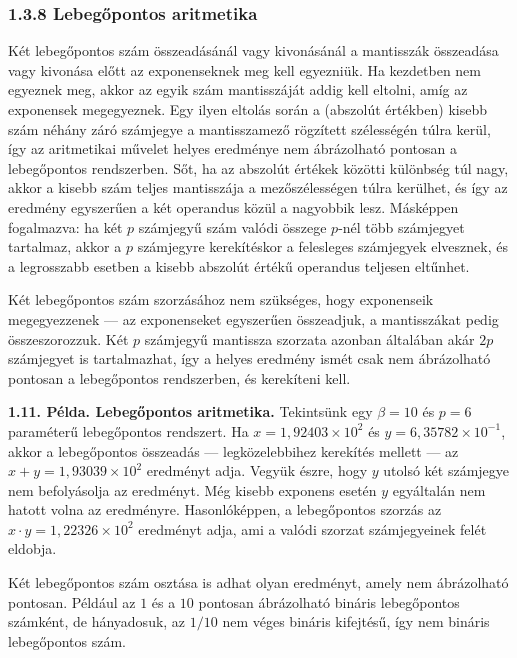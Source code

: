 \documentclass[
  magyar,
  11pt]{article}
\begin{document}
\subsubsection{1.3.8 Lebegőpontos
aritmetika}\label{lebegux151pontos-aritmetika}

Két lebegőpontos szám összeadásánál vagy kivonásánál a mantisszák
összeadása vagy kivonása előtt az exponenseknek meg kell egyezniük. Ha
kezdetben nem egyeznek meg, akkor az egyik szám mantisszáját addig kell
eltolni, amíg az exponensek megegyeznek. Egy ilyen eltolás során a
(abszolút értékben) kisebb szám néhány záró számjegye a mantisszamező
rögzített szélességén túlra kerül, így az aritmetikai művelet helyes
eredménye nem ábrázolható pontosan a lebegőpontos rendszerben. Sőt, ha
az abszolút értékek közötti különbség túl nagy, akkor a kisebb szám
teljes mantisszája a mezőszélességen túlra kerülhet, és így az eredmény
egyszerűen a két operandus közül a nagyobbik lesz. Másképpen fogalmazva:
ha két \(p\) számjegyű szám valódi összege \(p\)-nél több számjegyet
tartalmaz, akkor a \(p\) számjegyre kerekítéskor a felesleges számjegyek
elvesznek, és a legrosszabb esetben a kisebb abszolút értékű operandus
teljesen eltűnhet.

Két lebegőpontos szám szorzásához nem szükséges, hogy exponenseik
megegyezzenek --- az exponenseket egyszerűen összeadjuk, a mantisszákat
pedig összeszorozzuk. Két \(p\) számjegyű mantissza szorzata azonban
általában akár \(2p\) számjegyet is tartalmazhat, így a helyes eredmény
ismét csak nem ábrázolható pontosan a lebegőpontos rendszerben, és
kerekíteni kell.

\textbf{1.11. Példa. Lebegőpontos aritmetika.} Tekintsünk egy
\(\beta = 10\) és \(p = 6\) paraméterű lebegőpontos rendszert. Ha
\(x = 1{,}92403 \times 10^2\) és \(y = 6{,}35782 \times 10^{-1}\), akkor
a lebegőpontos összeadás --- legközelebbihez kerekítés mellett --- az
\(x + y = 1{,}93039 \times 10^2\) eredményt adja. Vegyük észre, hogy
\(y\) utolsó két számjegye nem befolyásolja az eredményt. Még kisebb
exponens esetén \(y\) egyáltalán nem hatott volna az eredményre.
Hasonlóképpen, a lebegőpontos szorzás az
\(x \cdot y = 1{,}22326 \times 10^2\) eredményt adja, ami a valódi
szorzat számjegyeinek felét eldobja.

Két lebegőpontos szám osztása is adhat olyan eredményt, amely nem
ábrázolható pontosan. Például az \(1\) és a \(10\) pontosan ábrázolható
bináris lebegőpontos számként, de hányadosuk, az \(1/10\) nem véges
bináris kifejtésű, így nem bináris lebegőpontos szám.
\end{document}
